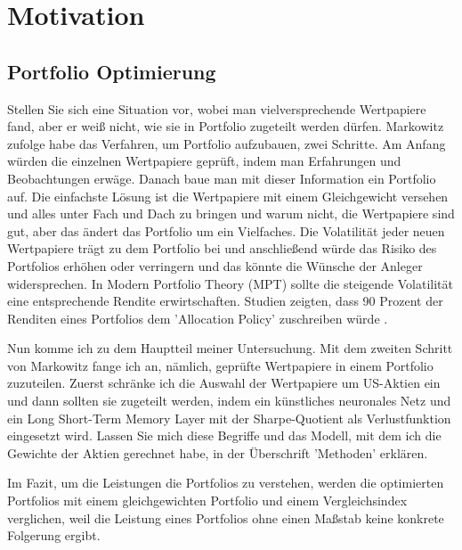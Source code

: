 \documentclass[12pt]{article}
\begin{document}
    \hypertarget{inhalt}{\tableofcontents}

    \newpage

    \newpage \section{Motivation} 
    
        \subsection{Portfolio Optimierung}
            
            Stellen Sie sich eine Situation vor, wobei man vielversprechende Wertpapiere fand, 
            aber er weiß nicht, wie sie in Portfolio zugeteilt werden dürfen. 
            Markowitz \cite{markowitz1952} zufolge habe das Verfahren, um Portfolio aufzubauen, zwei Schritte. 
            Am Anfang würden die einzelnen Wertpapiere geprüft, indem man Erfahrungen und Beobachtungen erwäge. 
            Danach baue man mit dieser Information ein Portfolio auf. 
            Die einfachste Lösung ist die Wertpapiere mit einem Gleichgewicht versehen und 
            alles unter Fach und Dach zu bringen und warum nicht, die Wertpapiere sind gut, 
            aber das ändert das Portfolio um ein Vielfaches.
            Die Volatilität jeder neuen Wertpapiere trägt zu dem Portfolio bei und
            anschließend würde das Risiko des Portfolios erhöhen oder verringern und das könnte die Wünsche der Anleger widersprechen. 
            In Modern Portfolio Theory (MPT) sollte die steigende Volatilität eine entsprechende Rendite erwirtschaften. 
            Studien zeigten, dass 90 Prozent der Renditen eines Portfolios dem 'Allocation Policy' zuschreiben würde \cite{reilly2022}.

            Nun komme ich zu dem Hauptteil meiner Untersuchung. 
            Mit dem zweiten Schritt von Markowitz fange ich an, nämlich, geprüfte Wertpapiere in einem Portfolio zuzuteilen. 
            Zuerst schränke ich die Auswahl der Wertpapiere um US-Aktien ein und
            dann sollten sie zugeteilt werden, indem ein künstliches neuronales Netz und
            ein Long Short-Term Memory Layer mit der Sharpe-Quotient als Verlustfunktion eingesetzt wird. 
            Lassen Sie mich diese Begriffe und das Modell, mit dem ich die Gewichte der Aktien gerechnet habe, 
            in der Überschrift 'Methoden' erklären.

            Im Fazit, um die Leistungen die Portfolios zu verstehen, 
            werden die optimierten Portfolios mit einem gleichgewichten Portfolio und 
            einem Vergleichsindex verglichen, weil die Leistung eines Portfolios ohne einen Maßstab keine konkrete Folgerung ergibt.
\end{document}
